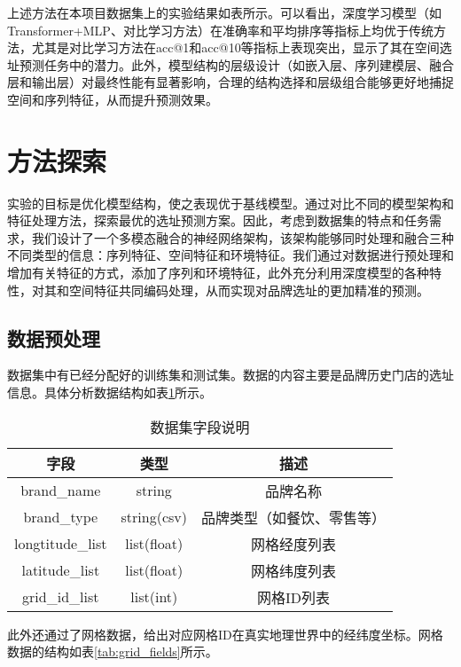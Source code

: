 \documentclass{article}
\begin{document}
上述方法在本项目数据集上的实验结果如表所示。可以看出，深度学习模型（如Transformer+MLP、对比学习方法）在准确率和平均排序等指标上均优于传统方法，尤其是对比学习方法在acc@1和acc@10等指标上表现突出，显示了其在空间选址预测任务中的潜力。此外，模型结构的层级设计（如嵌入层、序列建模层、融合层和输出层）对最终性能有显著影响，合理的结构选择和层级组合能够更好地捕捉空间和序列特征，从而提升预测效果。

\section{方法探索}

实验的目标是优化模型结构，使之表现优于基线模型。通过对比不同的模型架构和特征处理方法，探索最优的选址预测方案。因此，考虑到数据集的特点和任务需求，我们设计了一个多模态融合的神经网络架构，该架构能够同时处理和融合三种不同类型的信息：序列特征、空间特征和环境特征。我们通过对数据进行预处理和增加有关特征的方式，添加了序列和环境特征，此外充分利用深度模型的各种特性，对其和空间特征共同编码处理，从而实现对品牌选址的更加精准的预测。

\subsection{数据预处理}

数据集中有已经分配好的训练集和测试集。数据的内容主要是品牌历史门店的选址信息。具体分析数据结构如表\ref{tab:dataset_fields}所示。

\begin{table}[H]
\centering
\begin{tabular}{|c|c|c|}
\hline
\rowcolor[HTML]{D9EAD3}
\textbf{字段} & \textbf{类型} & \textbf{描述} \\ \hline
brand\_name & string & 品牌名称 \\ \hline
brand\_type & string(csv) & 品牌类型（如餐饮、零售等） \\ \hline
longtitude\_list & list(float) & 网格经度列表 \\ \hline
latitude\_list & list(float) & 网格纬度列表 \\ \hline
grid\_id\_list & list(int) & 网格ID列表 \\ \hline
\end{tabular}
\caption{数据集字段说明}
\label{tab:dataset_fields}
\end{table}


此外还通过了网格数据，给出对应网格ID在真实地理世界中的经纬度坐标。网格数据的结构如表\ref{tab:grid_fields}所示。
\end{document}
